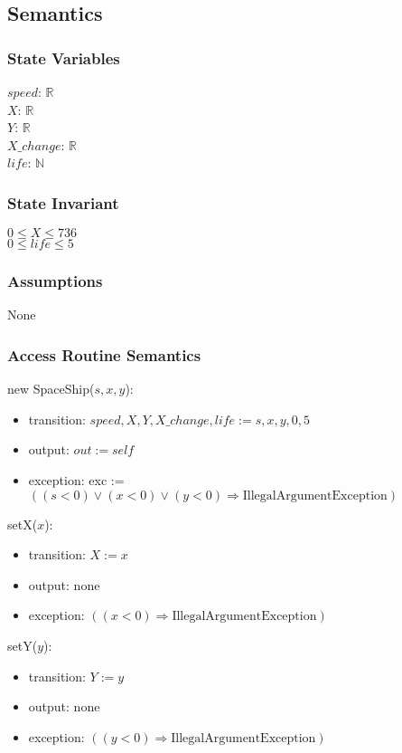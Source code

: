 \documentclass[12pt]{article}
\begin{document}
\subsection*{Semantics}
\subsubsection*{State Variables}
$\mathit{speed}$: $\mathbb{R}$\\
$\mathit{X}$: $\mathbb{R}$\\
$\mathit{Y}$: $\mathbb{R}$\\
$\mathit{X\_change}$: $\mathbb{R}$\\
$\mathit{life}$: $\mathbb{N}$
\subsubsection*{State Invariant}
$0 \leq X \leq 736$\\
$0 \leq life \leq 5$
\subsubsection*{Assumptions}
None
\subsubsection*{Access Routine Semantics}
\noindent new SpaceShip($\mathit{s}, \mathit{x}, \mathit{y}$):
\begin{itemize}
\item transition: $\mathit{speed}, \mathit{X}, \mathit{Y}, \mathit{X\_change}, \mathit{life} := \mathit{s}, \mathit{x},
  \mathit{y}, 0, 5$
\item output: $out := \mathit{self}$
\item exception: exc := $((\mathit{s} < 0) \vee (\mathit{x} < 0) \vee 
  (\mathit{y} < 0) \Rightarrow \text{IllegalArgumentException})$
\end{itemize}

\noindent setX($\mathit{x}$):
\begin{itemize}
\item transition: $X := x$ 
\item output: none
\item exception: $((\mathit{x} < 0) \Rightarrow \text{IllegalArgumentException})$
\end{itemize}

\noindent setY($\mathit{y}$):
\begin{itemize}
\item transition: $Y := y$ 
\item output: none
\item exception: $((\mathit{y} < 0) \Rightarrow \text{IllegalArgumentException})$
\end{itemize}
\end{document}
